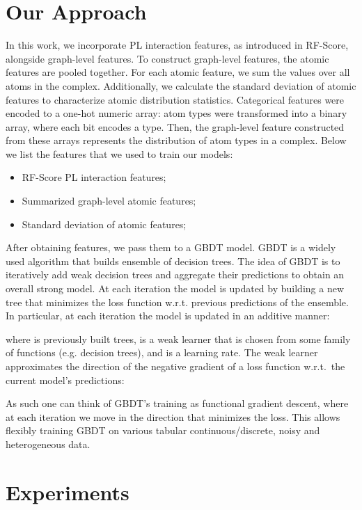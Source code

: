 \documentclass[nohyperref]{article}
\theoremstyle{plain}
\theoremstyle{definition}
\theoremstyle{remark}
\begin{document}
\section{Our Approach}
\label{sec:approach}
In this work, we incorporate PL interaction features, as introduced in RF-Score, alongside graph-level features. To construct graph-level features, the atomic features are pooled together. For each atomic feature, we sum the values over all atoms in the complex. Additionally, we calculate the standard deviation of atomic features to characterize atomic distribution statistics. Categorical features were encoded to a one-hot numeric array: atom types were transformed into a binary array, where each bit encodes a type. Then, the graph-level feature constructed from these arrays represents the distribution of atom types in a complex. Below we list the features that we used to train our models:
\begin{itemize}
  \item RF-Score PL interaction features;
  \item Summarized graph-level atomic features;
  \item Standard deviation of atomic features;
  \end{itemize}
After obtaining features, we pass them to a GBDT model. GBDT \cite{friedman2001greedy} is a widely used algorithm that builds ensemble of decision trees. The idea of GBDT is to iteratively add weak decision trees and aggregate their predictions to obtain an overall strong model. At each iteration the model is updated by building a new tree that minimizes the loss function w.r.t. previous predictions of the ensemble. In particular, at each iteration  the model  is updated in an additive manner:

where  is previously built trees,  is a weak learner that is chosen from some family of functions  (e.g. decision trees), and  is a learning rate. The weak learner  approximates the direction of the negative gradient of a loss function  w.r.t.~the current model's predictions:

As such one can think of GBDT's training as functional gradient descent, where at each iteration we move in the direction that minimizes the loss. This allows flexibly training GBDT on various tabular continuous/discrete, noisy and heterogeneous data.

\section{Experiments}
\label{sec:experiments}
\end{document}

